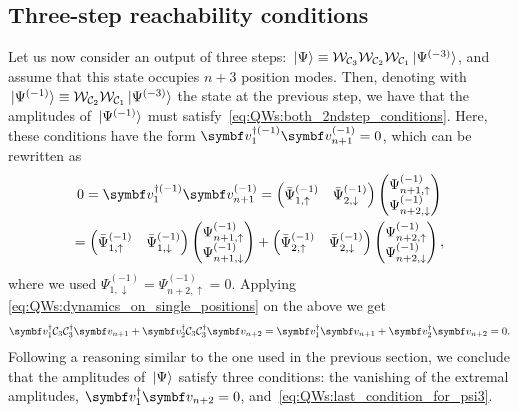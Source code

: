 \subsection{Three-step reachability conditions}
\label{sec:QWs:3step_reachability}
Let us now consider an output of three steps:
$\ket*{\Psi} \equiv {\mathcal{W}}_{{\mathcal{C}}_3}{\mathcal{W}}_{{\mathcal{C}}_2}{\mathcal{W}}_{{\mathcal{C}}_1} \ket*{\Psi^{(-3)}}$,
and assume that this state occupies $n+3$ position modes.
Then, denoting with
$\ket*{\Psi^{(-1)}} \equiv {\mathcal{W}}_{{\mathcal{C}}_2}{\mathcal{W}}_{{\mathcal{C}}_1} \ket*{\Psi^{(-3)}}$
the state at the previous step, we have that the amplitudes of $\ket*{\Psi^{(-1)}}$ must satisfy~\cref{eq:QWs:both_2ndstep_conditions}.
Here, these conditions have the form
$\bs v_1^{\dagger(-1)} \bs v_{n+1}^{(-1)}=0$,
which can be rewritten as
\begin{equation}
\begin{gathered}
	0 = \bs v_1^{\dagger(-1)} \bs v_{n+1}^{(-1)} = 
	\begin{pmatrix} \bar\Psi^{(-1)}_{1,\uparrow} & \bar\Psi^{(-1)}_{2,\downarrow} \end{pmatrix}
	\begin{pmatrix} \Psi^{(-1)}_{n+1,\uparrow} \\ \Psi^{(-1)}_{n+2,\downarrow} \end{pmatrix}
	\\
	=
	\begin{pmatrix} \bar\Psi^{(-1)}_{1,\uparrow} & \bar\Psi^{(-1)}_{1,\downarrow} \end{pmatrix}
	\begin{pmatrix} \Psi^{(-1)}_{n+1,\uparrow} \\ \Psi^{(-1)}_{n+1,\downarrow} \end{pmatrix} +
	\begin{pmatrix} \bar\Psi^{(-1)}_{2,\uparrow} & \bar\Psi^{(-1)}_{2,\downarrow} \end{pmatrix}
	\begin{pmatrix} \Psi^{(-1)}_{n+2,\uparrow} \\ \Psi^{(-1)}_{n+2,\downarrow} \end{pmatrix},
\end{gathered}
\end{equation}
where we used
$\Psi^{(-1)}_{1,\downarrow} = \Psi^{(-1)}_{n+2,\uparrow} = 0$.
Applying \cref{eq:QWs:dynamics_on_single_positions} on the above we get
\begin{equation}
\begin{aligned}
    \bs v_1^{\dagger} \calC_3 \calC_3^\dagger \bs v_{n+1}+
    \bs v_2^{\dagger} \calC_3 \calC_3^\dagger \bs v_{n+2}  =
    \bs v_1^{\dagger} \bs v_{n+1} +
    \bs v_2^{\dagger} \bs v_{n+2} = 0.
\end{aligned}
\label{eq:QWs:last_condition_for_psi3}
\end{equation}
Following a reasoning similar to the one used in the previous section, we conclude that the amplitudes of $\ket*{\Psi}$ satisfy three conditions:
the vanishing of the extremal amplitudes, $\bs v_1^{\dagger} \bs v_{n+2} = 0$, and~\cref{eq:QWs:last_condition_for_psi3}.

